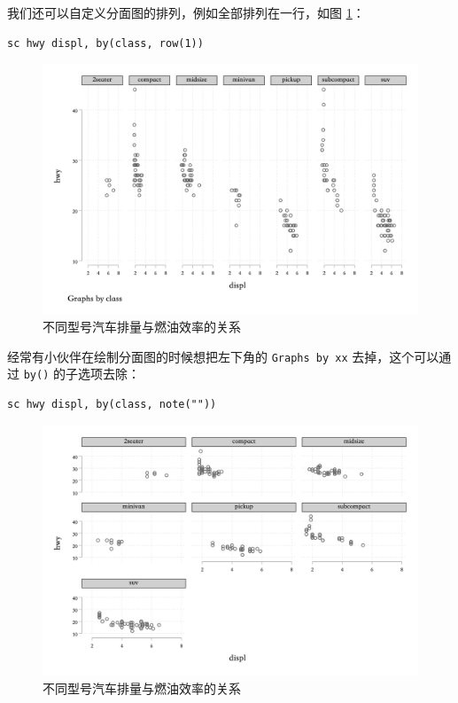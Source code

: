 我们还可以自定义分面图的排列，例如全部排列在一行，如图 \ref{fig:hwydisplbyclass2}：

\begin{lstlisting}
sc hwy displ, by(class, row(1))
\end{lstlisting}

\begin{figure}[htbp]
  \centering
  \includegraphics[width=1\textwidth]{assets/hwydisplbyclass2.png}
  \caption{不同型号汽车排量与燃油效率的关系}\label{fig:hwydisplbyclass2}
\end{figure}

经常有小伙伴在绘制分面图的时候想把左下角的 \texttt{Graphs\ by\ xx} 去掉，这个可以通过 \texttt{by()} 的子选项去除：

\begin{lstlisting}
sc hwy displ, by(class, note(""))
\end{lstlisting}

\begin{figure}[htbp]
  \centering
  \includegraphics[width=1\textwidth]{assets/hwydisplbyclass3.png}
  \caption{不同型号汽车排量与燃油效率的关系}
  \label{fig:hwydisplbyclass3}
\end{figure}

